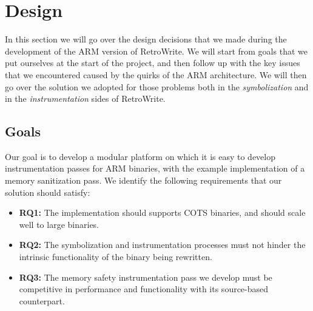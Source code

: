 \documentclass[a4paper,11pt,oneside]{report}
\newcommand{\sysname}{RetroWrite\xspace}
\newcommand{\todo}[1]{%
	\begingroup 
	\sethlcolor{cyan}%
	\hl{TODO: #1}%
	\endgroup
}
\begin{document}



\chapter{Design}

In this section we will go over the design decisions that we made during the 
development of the ARM version of \sysname. We will start from goals that we 
put ourselves at the start of the project, and then follow up with the key 
issues that we encountered caused by the quirks of the ARM architecture. We 
will then go over the solution we adopted for those problems both in the 
\emph{symbolization} and in the \emph{instrumentation} sides of \sysname. 

\section{Goals}


Our goal is to develop a modular platform on which it is easy to develop 
instrumentation passes for ARM binaries, with the example implementation of a 
memory sanitization pass.  We identify the following requirements that our 
solution should satisfy:

\begin{itemize}
	\item \textbf{RQ1:} The implementation should supports COTS binaries, and 
		should scale well to large binaries.
	\item \textbf{RQ2:} The symbolization and instrumentation processes must 
		not hinder the intrinsic functionality of the binary being rewritten.
	\item \textbf{RQ3:} The memory safety instrumentation pass we develop must 
		be competitive in performance and functionality with its source-based 
		counterpart.


\end{itemize}
\end{document}
